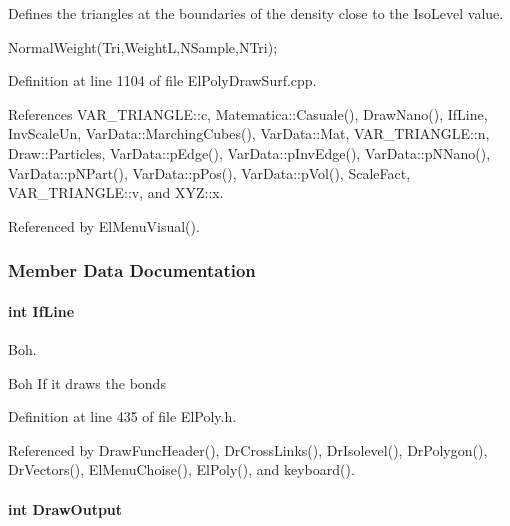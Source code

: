 \-Defines the triangles at the boundaries of the density close to the \-Iso\-Level value. 

\-Normal\-Weight(\-Tri,\-Weight\-L,\-N\-Sample,\-N\-Tri); 

\-Definition at line 1104 of file \-El\-Poly\-Draw\-Surf.\-cpp.



\-References \-V\-A\-R\-\_\-\-T\-R\-I\-A\-N\-G\-L\-E\-::c, \-Matematica\-::\-Casuale(), \-Draw\-Nano(), \-If\-Line, \-Inv\-Scale\-Un, \-Var\-Data\-::\-Marching\-Cubes(), \-Var\-Data\-::\-Mat, \-V\-A\-R\-\_\-\-T\-R\-I\-A\-N\-G\-L\-E\-::n, \-Draw\-::\-Particles, \-Var\-Data\-::p\-Edge(), \-Var\-Data\-::p\-Inv\-Edge(), \-Var\-Data\-::p\-N\-Nano(), \-Var\-Data\-::p\-N\-Part(), \-Var\-Data\-::p\-Pos(), \-Var\-Data\-::p\-Vol(), \-Scale\-Fact, \-V\-A\-R\-\_\-\-T\-R\-I\-A\-N\-G\-L\-E\-::v, and \-X\-Y\-Z\-::x.



\-Referenced by \-El\-Menu\-Visual().



\subsubsection{\-Member \-Data \-Documentation}
\hypertarget{classElPoly_ac3e70209b515c8a6293fcdb019a2fb29}{
\paragraph[{\-If\-Line}]{\setlength{\rightskip}{0pt plus 5cm}int {\bf \-If\-Line}}}\label{classElPoly_ac3e70209b515c8a6293fcdb019a2fb29}


\-Boh. 

\-Boh \-If it draws the bonds 

\-Definition at line 435 of file \-El\-Poly.\-h.



\-Referenced by \-Draw\-Func\-Header(), \-Dr\-Cross\-Links(), \-Dr\-Isolevel(), \-Dr\-Polygon(), \-Dr\-Vectors(), \-El\-Menu\-Choise(), \-El\-Poly(), and keyboard().

\hypertarget{classElPoly_af2d26fec9f7faeae1c79eb64268776c0}{
\paragraph[{\-Draw\-Output}]{\setlength{\rightskip}{0pt plus 5cm}int {\bf \-Draw\-Output}}}\label{classElPoly_af2d26fec9f7faeae1c79eb64268776c0}


